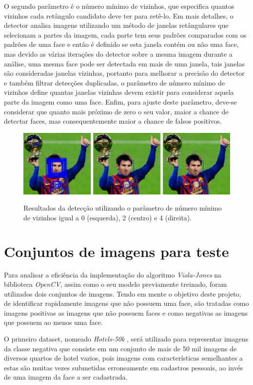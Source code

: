  O segundo parâmetro é o número mínimo de vizinhos, que especifica quantos vizinhos cada retângulo candidato deve ter para retê-lo. Em mais detalhes, o detector analisa imagens utilizando um método de janelas retângulares que selecionam a partes da imagem, cada parte tem seus padrões comparados com os padrões de uma face e então é definido se esta janela contém ou não uma face, mas devido as várias iterações do detector sobre a mesma imagem durante a análise, uma mesma face pode ser detectada em mais de uma janela, tais janelas são consideradas janelas vizinhas, portanto para melhorar a precisão do detector e também filtrar detecções duplicadas, o parâmetro de número mínimo de vizinhos define quantas janelas vizinhas devem existir para considerar aquela parte da imagem como uma face. Enfim, para ajuste deste parâmetro, deve-se considerar que quanto mais próximo de zero o seu valor, maior a chance de detectar faces, mas consequentemente maior a chance de falsos positivos.

 \begin{figure}[htb]
    \centering
    \caption{Resultados da detecção utilizando o parâmetro de número mínimo de vizinhos igual a 0 (esquerda), 2 (centro) e 4 (direita).}
    \includegraphics[scale=.2]{figs/min_neighbors_messi.png}
    \label{fig:min-neighbors-messi}
 \end{figure}

 \section{Conjuntos de imagens para teste}

 Para analisar a eficiência da implementação do algoritmo \textit{Viola-Jones} na biblioteca \textit{OpenCV}, assim como o seu modelo previamente treinado, foram utilizados dois conjuntos de imagens. Tendo em mente o objetivo deste projeto, de identificar rapidamente imagens que não possuem uma face, são tratadas como imagens positivas as imagens que não possuem faces e como negativas as imagens que possuem ao menos uma face.

O primeiro dataset, nomeado \textit{Hotels-50k} \cite{hotels50k-article}, será utilizado para representar imagens da classe negativa que consiste em um conjunto de mais de 50 mil imagens de diversos quartos de hotel vazios, pois imagens com características semelhantes a estas são muitas vezes submetidas erroneamente em cadastros pessoais, ao invés de uma imagem da face a ser cadastrada.

